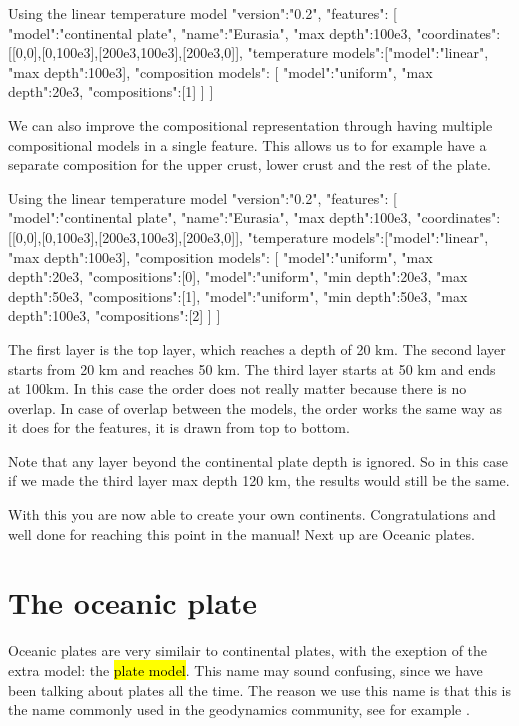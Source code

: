 \documentclass{book}
\begin{document}
\begin{javascriptcode}{Using the linear temperature model}{}
{
  "version":"0.2",
  "features":
  [
    {
      "model":"continental plate", "name":"Eurasia", "max depth":100e3,
      "coordinates":[[0,0],[0,100e3],[200e3,100e3],[200e3,0]],
      "temperature models":[{"model":"linear", "max depth":100e3}],
      "composition models":
      [
        {"model":"uniform", "max depth":20e3, "compositions":[1]}
      ]
    }
  ]
}
\end{javascriptcode}

We can also improve the compositional representation through having multiple compositional models in a single feature. This allows us to for example have a separate composition for the upper crust, lower crust and the rest of the plate.

\begin{javascriptcode}{Using the linear temperature model}{}
{
  "version":"0.2",
  "features":
  [
    {
      "model":"continental plate", "name":"Eurasia", "max depth":100e3,
      "coordinates":[[0,0],[0,100e3],[200e3,100e3],[200e3,0]],
      "temperature models":[{"model":"linear", "max depth":100e3}],
      "composition models":
      [
        {"model":"uniform", "max depth":20e3, "compositions":[0]},
        {"model":"uniform", "min depth":20e3, "max depth":50e3, "compositions":[1]},
        {"model":"uniform", "min depth":50e3, "max depth":100e3, "compositions":[2]}
      ]
    }
  ]
}
\end{javascriptcode}

The first layer is the top layer, which reaches a depth of 20 km. The second layer starts from 20 km and reaches 50 km. The third layer starts at 50 km and ends at 100km. In this case the order does not really matter because there is no overlap. In case of overlap between the models, the order works the same way as it does for the features, it is drawn from top to bottom.

\begin{remark}
Note that any layer beyond the continental plate depth is ignored. So in this case if we made the third layer max depth 120 km, the results would still be the same.
\end{remark}

With this you are now able to create your own continents. Congratulations and well done for reaching this point in the manual! Next up are Oceanic plates.

\section{The oceanic plate}
Oceanic plates are very similair to continental plates, with the exeption of the extra model: the \hl{plate model}. This name may sound confusing, since we have been talking about plates all the time. The reason we use this name is that this is the name commonly used in the geodynamics community, see for example \cite{fowler2005}. 
\end{document}
